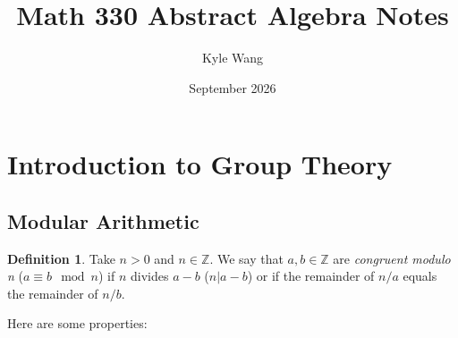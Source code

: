 \documentclass{article}
\title{Math 330 Abstract Algebra Notes}
\author{Kyle Wang}
\date{September 2026}
\newcommand{\Z}{\mathbb{Z}}
\theoremstyle{definition}
\newtheorem{definition}[theorem]{Definition}
\begin{document}
\maketitle
\tableofcontents
\section{Introduction to Group Theory}
\subsection{Modular Arithmetic}
\begin{definition}
    Take $n>0$ and $n\in \Z $. We say that $a,b\in \Z$ are \textit{congruent modulo n} ($a\equiv b \mod{n}$) if $n$ divides $a-b$ ($n|a-b$) or if the remainder of $n/a$ equals the remainder of $n/b$.
\end{definition}
Here are some properties:
\end{document}
